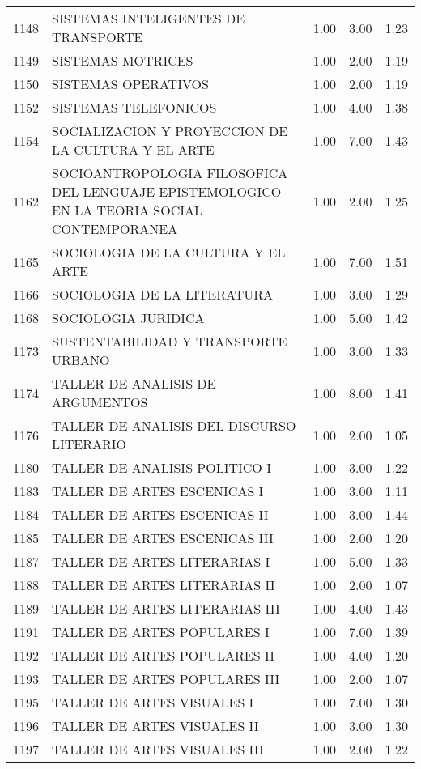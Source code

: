 \begin{table}[ht]
\begin{tabular}{rlrrr}
  1148 & SISTEMAS INTELIGENTES DE TRANSPORTE & 1.00 & 3.00 & 1.23 \\ 
  1149 & SISTEMAS MOTRICES & 1.00 & 2.00 & 1.19 \\ 
  1150 & SISTEMAS OPERATIVOS & 1.00 & 2.00 & 1.19 \\ 
  1152 & SISTEMAS TELEFONICOS & 1.00 & 4.00 & 1.38 \\ 
  1154 & SOCIALIZACION Y PROYECCION DE LA CULTURA Y EL ARTE & 1.00 & 7.00 & 1.43 \\ 
  1162 & SOCIOANTROPOLOGIA FILOSOFICA DEL LENGUAJE EPISTEMOLOGICO EN LA TEORIA SOCIAL CONTEMPORANEA & 1.00 & 2.00 & 1.25 \\ 
  1165 & SOCIOLOGIA DE LA CULTURA Y EL ARTE & 1.00 & 7.00 & 1.51 \\ 
  1166 & SOCIOLOGIA DE LA LITERATURA & 1.00 & 3.00 & 1.29 \\ 
  1168 & SOCIOLOGIA JURIDICA & 1.00 & 5.00 & 1.42 \\ 
  1173 & SUSTENTABILIDAD Y TRANSPORTE URBANO & 1.00 & 3.00 & 1.33 \\ 
  1174 & TALLER DE ANALISIS DE ARGUMENTOS & 1.00 & 8.00 & 1.41 \\ 
  1176 & TALLER DE ANALISIS DEL DISCURSO LITERARIO & 1.00 & 2.00 & 1.05 \\ 
  1180 & TALLER DE ANALISIS POLITICO I & 1.00 & 3.00 & 1.22 \\ 
  1183 & TALLER DE ARTES ESCENICAS I & 1.00 & 3.00 & 1.11 \\ 
  1184 & TALLER DE ARTES ESCENICAS II & 1.00 & 3.00 & 1.44 \\ 
  1185 & TALLER DE ARTES ESCENICAS III & 1.00 & 2.00 & 1.20 \\ 
  1187 & TALLER DE ARTES LITERARIAS I & 1.00 & 5.00 & 1.33 \\ 
  1188 & TALLER DE ARTES LITERARIAS II & 1.00 & 2.00 & 1.07 \\ 
  1189 & TALLER DE ARTES LITERARIAS III & 1.00 & 4.00 & 1.43 \\ 
  1191 & TALLER DE ARTES POPULARES I & 1.00 & 7.00 & 1.39 \\ 
  1192 & TALLER DE ARTES POPULARES II & 1.00 & 4.00 & 1.20 \\ 
  1193 & TALLER DE ARTES POPULARES III & 1.00 & 2.00 & 1.07 \\ 
  1195 & TALLER DE ARTES VISUALES I & 1.00 & 7.00 & 1.30 \\ 
  1196 & TALLER DE ARTES VISUALES II & 1.00 & 3.00 & 1.30 \\ 
  1197 & TALLER DE ARTES VISUALES III & 1.00 & 2.00 & 1.22 \\ 

\end{tabular}
\end{table}
